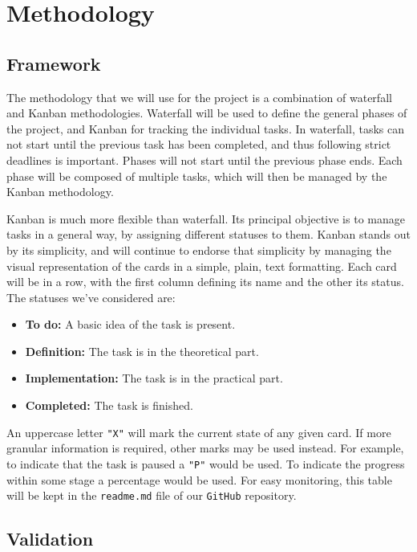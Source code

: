 \section{Methodology}

\subsection{Framework}

The methodology that we will use for the project is a combination of waterfall and Kanban methodologies. Waterfall will be used to define the general phases of the project, and Kanban for tracking the individual tasks. In waterfall, tasks can not start until the previous task has been completed, and thus following strict deadlines is important. Phases will not start until the previous phase ends. Each phase will be composed of multiple tasks, which will then be managed by the Kanban method\-ol\-o\-gy.

Kanban is much more flexible than waterfall. Its principal objective is to manage tasks in a general way, by assigning different statuses to them. Kanban stands out by its simplicity, and will continue to endorse that simplicity by managing the visual representation of the cards in a simple, plain, text formatting. Each card will be in a row, with the first column defining its name and the other its status. The statuses we've considered are:

\begin{itemize}
    \item \textbf{To do:} A basic idea of the task is present.
    \item \textbf{Definition:} The task is in the theoretical part.
    \item \textbf{Implementation:} The task is in the practical part.
    \item \textbf{Completed:} The task is finished.
\end{itemize}

An uppercase letter \texttt{"X"} will mark the current state of any given card. If more granular information is required, other marks may be used instead. For example, to indicate that the task is paused a \texttt{"P"} would be used. To indicate the progress within some stage a percentage would be used. For easy monitoring, this table will be kept in the \texttt{readme.md} file of our \texttt{GitHub} repository.

\subsection{Validation}

